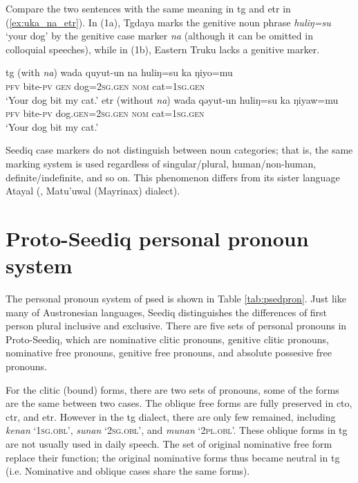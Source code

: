 Compare the two sentences with the same meaning in \acl{tg} and \acl{etr} in (\ref{ex:uka_na_etr}). In (1a), Tgdaya marks the genitive noun phrase \textit{huliŋ=su} `your dog' by the genitive case marker \textit{na} (although it can be omitted in colloquial speeches), while in (1b), Eastern Truku lacks a genitive marker. 

\begin{exe}
\ex \label{ex:uka_na_etr} \textcite[69]{Lee2018Trugrammar}
    \begin{xlist}
    \ex \acl{tg} (with \textit{na})
    \gll wada quyut-un na huliŋ=su ka ŋiyo=mu \\
    \textsc{pfv} bite-\textsc{pv} \textsc{gen} dog=\textsc{2sg.gen} \textsc{nom} cat=\textsc{1sg.gen}\\
    \glt `Your dog bit my cat.'
    \ex \acl{etr} (without \textit{na})
    \gll wada qəyut-un huliŋ=su ka ŋiyaw=mu \\
    \textsc{pfv} bite-\textsc{pv} dog.\textsc{gen}=\textsc{2sg.gen} \textsc{nom} cat=\textsc{1sg.gen}\\
    \glt `Your dog bit my cat.'
    \end{xlist}
\end{exe}

Seediq case markers do not distinguish between noun categories; that is, the same marking system is used regardless of singular/plural, human/non-human, definite/indefinite, and so on. This phenomenon differs from its sister language Atayal (\cite{huang1995}, Matu'uwal (Mayrinax) dialect).

\section{Proto-Seediq personal pronoun system} \label{sec:psed_pron}

The personal pronoun system of \acl{psed} is shown in Table \ref{tab:psedpron}. Just like many of Austronesian languages, Seediq distinguishes the differences of first person plural inclusive and exclusive. There are five sets of personal pronouns in Proto-Seediq, which are nominative clitic pronouns, genitive clitic pronouns, nominative free pronouns, genitive free pronouns, and absolute possesive free pronouns. 

For the clitic (bound) forms, there are two sets of pronouns, some of the forms are the same between two cases. The oblique free forms are fully preserved in \acl{cto}, \acl{ctr}, and \acl{etr}. However in the \acl{tg} dialect, there are only few remained, including \textit{kenan} `\textsc{1sg.obl}', \textit{sunan} `\textsc{2sg.obl}', and \textit{munan} `\textsc{2pl.obl}'. These oblique forms in \acl{tg} are not usually used in daily speech. The set of original nominative free form replace their function; the original nominative forms thus became neutral in \acl{tg} (i.e. Nominative and oblique cases share the same forms).

